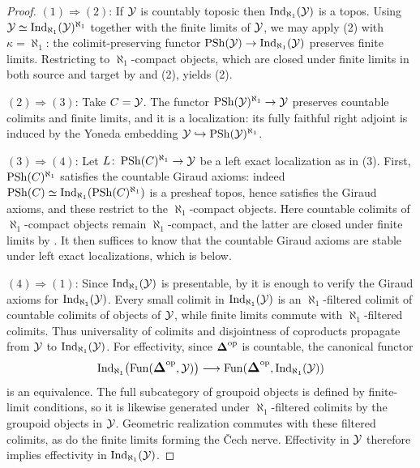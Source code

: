 \documentclass[11pt]{book}
\begin{document}
	\begin{proof}
		$(1) \Rightarrow (2)$: If $\mathcal{Y}$ is countably toposic then $\operatorname{Ind}_{\aleph_1}(\mathcal{Y})$ is a topos. Using $\mathcal{Y} \simeq \operatorname{Ind}_{\aleph_1}(\mathcal{Y})^{\aleph_1}$ together with the finite limits of $\mathcal{Y}$, we may apply (2) with $\kappa = \aleph_1$: the colimit-preserving functor $\operatorname{PSh}(\mathcal{Y}) \to \operatorname{Ind}_{\aleph_1}(\mathcal{Y})$ preserves finite limits. Restricting to $\aleph_1$-compact objects, which are closed under finite limits in both source and target by  and (2), yields (2).

		$(2) \Rightarrow (3)$: Take $C = \mathcal{Y}$. The functor $\operatorname{PSh}(\mathcal{Y})^{\aleph_1} \to \mathcal{Y}$ preserves countable colimits and finite limits, and it is a localization: its fully faithful right adjoint is induced by the Yoneda embedding $\mathcal{Y} \hookrightarrow \operatorname{PSh}(\mathcal{Y})^{\aleph_1}$.

		$(3) \Rightarrow (4)$: Let $L\colon \operatorname{PSh}(C)^{\aleph_1} \to \mathcal{Y}$ be a left exact localization as in (3). First, $\operatorname{PSh}(C)^{\aleph_1}$ satisfies the countable Giraud axioms: indeed $\operatorname{PSh}(C) \simeq \operatorname{Ind}_{\aleph_1}(\operatorname{PSh}(C)^{\aleph_1})$ is a presheaf topos, hence satisfies the Giraud axioms, and these restrict to the $\aleph_1$-compact objects. Here countable colimits of $\aleph_1$-compact objects remain $\aleph_1$-compact, and the latter are closed under finite limits by . It then suffices to know that the countable Giraud axioms are stable under left exact localizations, which is  below.

		$(4) \Rightarrow (1)$: Since $\operatorname{Ind}_{\aleph_1}(\mathcal{Y})$ is presentable, by  it is enough to verify the Giraud axioms for $\operatorname{Ind}_{\aleph_1}(\mathcal{Y})$. Every small colimit in $\operatorname{Ind}_{\aleph_1}(\mathcal{Y})$ is an $\aleph_1$-filtered colimit of countable colimits of objects of $\mathcal{Y}$, while finite limits commute with $\aleph_1$-filtered colimits. Thus universality of colimits and disjointness of coproducts propagate from $\mathcal{Y}$ to $\operatorname{Ind}_{\aleph_1}(\mathcal{Y})$. For effectivity, since $\simp\catop$ is countable, the canonical functor
		\[
			\Ind_{\aleph_1}\bigl(\Fun(\simp\catop, \Yy)\bigr) \longrightarrow \Fun(\simp\catop, \Ind_{\aleph_1}(\Yy))
		\]
		is an equivalence. The full subcategory of groupoid objects is defined by finite-limit conditions, so it is likewise generated under $\aleph_1$-filtered colimits by the groupoid objects in $\mathcal{Y}$. Geometric realization commutes with these filtered colimits, as do the finite limits forming the Čech nerve. Effectivity in $\mathcal{Y}$ therefore implies effectivity in $\operatorname{Ind}_{\aleph_1}(\mathcal{Y})$.
	\end{proof}
\end{document}
